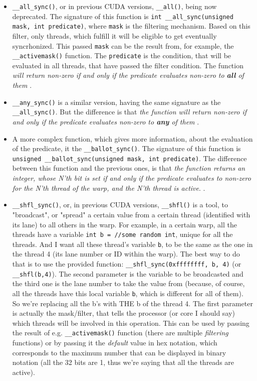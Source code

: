 \begin{itemize}
    \item \verb|__all_sync()|, or in previous CUDA versions, \verb|__all()|, being now deprecated. The signature of this function is \verb|int __all_sync(unsigned mask, int predicate)|, 
      where \verb|mask| is the filtering mechanism. Based on this filter, only threads, which 
    fulfill it will be eligible to get eventually syncrhonized. This passed \verb|mask| 
  can be the result from, for example, the \verb|__activemask()| function. The \verb|predicate| is the 
    condition, that will be evaluated in all threads, that have passed the filter condition. 
    The function \textsl{will return non-zero if and only if the predicate evaluates non-zero to \textbf{all} of them} \cite{center}.
  \item \verb|__any_sync()| is a similar version, having the same signature as the 
    \verb|__all_sync()|. But the difference is that \textsl{the function will return non-zero if and only if the predicate evaluates non-zero to \textbf{any} of them} \cite{center}.
  \item A more complex function, which gives more information, about the evaluation of the predicate,
    it the \verb|__ballot_sync()|. The signature of this function is \verb|unsigned __ballot_sync(unsigned mask, int predicate)|. The difference between this function and the previous ones, 
    is that \textsl{the function returns an integer, whose N'th bit is set if and only if the predicate evaluates to non-zero for the N'th thread of the warp, and the N'th thread is active}. \cite{center}.
    \item \verb|__shfl_sync()|, or, in previous CUDA versions, \verb|__shfl()| is a tool, to "broadcast", or "spread"
        a certain value from a certain thread (identified with its lane) to all others in the warp. For example, 
        in a certain warp, all the threads have a variable \verb|int b = //some random int|, unique for all 
        the threads. And I want all these thread's variable \verb|b|, to be the same as the one in the thread 
        4 (its lane number or ID within the warp). The best way to do that is to use the provided function:
        \verb|__shfl_sync(0xffffffff, b, 4)| (or \verb|__shfl(b,4)|). The second parameter is the variable to be 
        broadcasted and the third one is the lane number to take the value from (because, of course, all the 
        threads have this local variable \verb|b|, which is different for all of them). So we're replacing all the 
        b's with THE b of the thread 4. The first parameter is actually the mask/filter, that tells the 
        processor (or core I should say) which threads will be involved in this operation. This can be used 
        by passing the result of e.g. \verb|__activemask()| function (there are multiple \textit{filtering} functions)
        or by passing it the \textit{default} value in hex notation, which corresponds to the maximum number 
        that can be displayed in binary notation (all the 32 bits are 1, thus we're saying that all the threads are active).


\end{itemize}
